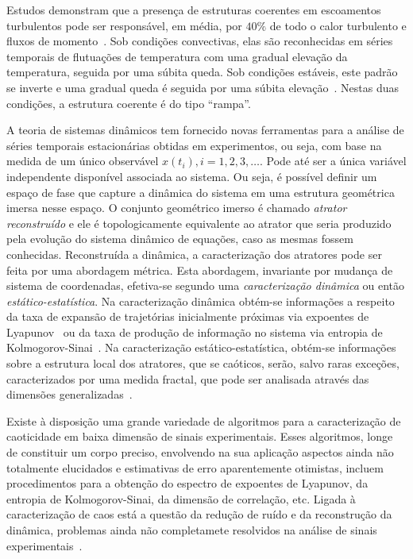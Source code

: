 Estudos demonstram que a presença de estruturas coerentes em escoamentos turbulentos pode ser responsável, em média, por $40\%$ de todo o calor turbulento e fluxos de momento~\cite{lu/94}. Sob condições convectivas, elas são reconhecidas em séries temporais de flutuações de temperatura com uma gradual elevação da temperatura, seguida por uma súbita queda. Sob condições estáveis, este padrão se inverte e uma gradual queda é seguida por uma súbita elevação~\cite{oliver/02}. Nestas duas condições, a estrutura coerente é do tipo ``rampa''. 

A teoria de sistemas dinâmicos tem fornecido novas ferramentas para a análise de séries temporais estacionárias obtidas em experimentos, ou seja, com base na medida de um único observável $x(t_{i}),i=1,2,3,\ldots$. Pode até ser a única variável independente disponível associada ao sistema. Ou seja, é possível definir um espaço de fase que capture a dinâmica do sistema em uma estrutura geométrica imersa nesse espaço. O conjunto geométrico imerso é chamado \textit{atrator reconstruído} e ele é topologicamente equivalente ao atrator que seria produzido pela evolução do sistema dinâmico de equações, caso as mesmas fossem conhecidas. Reconstruída a dinâmica, a caracterização dos atratores pode ser feita por uma abordagem métrica. Esta abordagem, invariante por mudança de sistema de coordenadas, efetiva-se segundo uma \textit{caracterização dinâmica} ou então \textit{estático-estatística}. Na caracterização dinâmica obtém-se informações a respeito da taxa de expansão de trajetórias inicialmente próximas via expoentes de Lyapunov~\cite{wolf/85,eckrue/86,sanosawada/85} ou da taxa de produção de informação no sistema via entropia de Kolmogorov-Sinai~\cite{ruelleentrop/89}. Na caracterização estático-estatística, obtém-se informações sobre a estrutura local dos atratores, que se caóticos, serão, salvo raras exceções, caracterizados por uma medida fractal, que pode ser analisada através das dimensões generalizadas~\cite{grassproca/83}.

Existe à disposição uma grande variedade de algoritmos para a caracterização de caoticidade em baixa dimensão de sinais experimentais. Esses algoritmos, longe de constituir um corpo preciso, envolvendo na sua aplicação aspectos ainda não totalmente elucidados e estimativas de erro aparentemente otimistas, incluem procedimentos para a obtenção do espectro de expoentes de Lyapunov, da entropia de Kolmogorov-Sinai, da dimensão de correlação, etc. Ligada à caracterização de caos está a questão da redução de ruído e da reconstrução da dinâmica, problemas ainda não completamete resolvidos na análise de sinais experimentais~\cite{aguirre/00}. 


